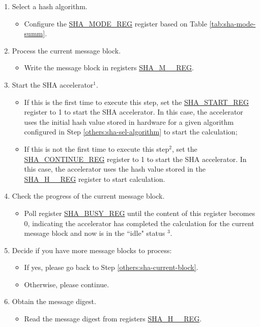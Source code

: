 \documentclass[main\_\_EN.tex]{subfiles}
\begin{document}
\begin{enumerate}
    \item \label{others:sha-sel-algorithm} Select a hash algorithm.
    \begin{itemize}
        \item Configure the \hyperref[regdesc:SHAMODEREG]{SHA\_MODE\_REG} register based on Table \ref{tab:sha-mode-summ}.
    \end{itemize}
    \item \label{others:sha-current-block} Process the current message block.
    \begin{itemize}
        \item Write the message block in registers \hyperref[regdesc:SHAMNREG]{SHA\_M\_\_REG}.
    \end{itemize}
    \item Start the SHA accelerator\hyperref[others:sha-note-typical-sha]{$^1$}.
    \begin{itemize}
        \item If this is the first time to execute this step, set the \hyperref[regdesc:SHASTARTREG]{SHA\_START\_REG} register to 1 to start the SHA accelerator. In this case, the accelerator uses the initial hash value stored in hardware for a given algorithm configured in Step \ref{others:sha-sel-algorithm} to start the calculation;
        \item If this is not the first time to execute this step\hyperref[others:sha-note-typical-sha]{$^2$}, set the \hyperref[regdesc:SHACONTINUEREG]{SHA\_CONTINUE\_REG} register to 1 to start the SHA accelerator. In this case, the accelerator uses the hash value stored in the \hyperref[regdesc:SHAHNREG]{SHA\_H\_\_REG} register to start calculation.
    \end{itemize}
    \item Check the progress of the current message block.
    \begin{itemize}
        \item Poll register \hyperref[regdesc:SHABUSYREG]{SHA\_BUSY\_REG} until the content of this register becomes 0, indicating the accelerator has completed the calculation for the current message block and now is in the ``idle" status \hyperref[others:sha-note-typical-sha]{$^3$}.
    \end{itemize}

    \item Decide if you have more message blocks to process:
    \begin{itemize}
        \item If yes, please go back to Step \ref{others:sha-current-block}.
        \item Otherwise, please continue.
    \end{itemize}
    \item Obtain the message digest.
    \begin{itemize}
        \item Read the message digest from registers \hyperref[regdesc:SHAHNREG]{SHA\_H\_\_REG}.
    \end{itemize}
\end{enumerate}
\end{document}
